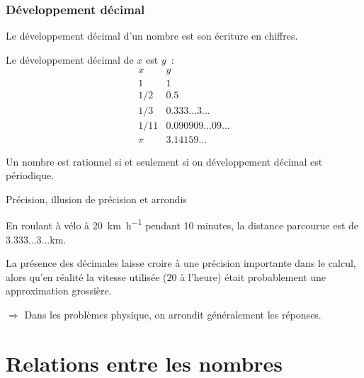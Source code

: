 \begin{frame}%
  \frametitle{Développement décimal}
  Le développement décimal d'un nombre est son écriture \og en chiffres\fg{}.

  Le développement décimal de \(x\) est \(y\)~:
  \begin{equation*}
    \begin{array}{cc}
      x & y \\\hline
      1 & 1 \\
      1/2 & 0.5\\
      1/3 & 0.333...3...\\
      1/11 & 0.090909...09...\\
      \pi & 3.14159...
    \end{array}
  \end{equation*}

  \begin{theorem}
    Un nombre est rationnel si et seulement si on développement décimal est périodique.
  \end{theorem}
\end{frame}
\begin{frame}{Précision, illusion de précision et arrondis}
  \begin{example}
    En roulant à vélo à \SI{20}{\km\per\hour} pendant 10 minutes, la distance parcourue est de 3.333...3...\si{\km}.
  \end{example}

  La présence des décimales laisse croire à une précision importante dans le calcul, alors qu'en réalité la vitesse utilisée (20 à l'heure) était probablement une approximation grossière.\pause

  \(\Rightarrow\) Dans les problèmes physique, on arrondit généralement les réponses.
\end{frame}

\section{Relations entre les nombres}
